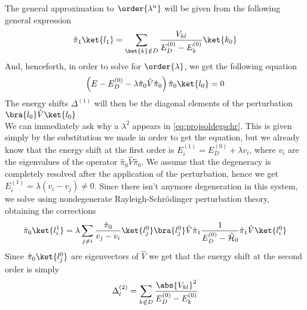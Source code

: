 \documentclass[a4paper, 11pt]{book}
\newcommand{\1}{\opr{\mathds{1}}}
\newcommand{\ham}{\mathcal{H}}
\newcommand{\opr}[1]{\hat{#1}}
\theoremstyle{plain}
\begin{document}
	The general approximation to $\order{\lambda^n}$ will be given from the following general expression
	\begin{equation*}
		\opr{\pi}_1\ket{l_1}=\sum_{\ket{k}\notin D}\frac{V_{kl}}{E_D^{(0)}-E_k^{(0)}}\ket{k_0}
	\end{equation*}
	And, henceforth, in order to solve for $\order{\lambda}$, we get the following equation
	\begin{equation}
		\left( E-E_D^{(0)}-\lambda\opr{\pi}_0\opr{V}\opr{\pi}_0 \right)\opr{\pi}_0\ket{l_0}=0
		\label{eq:firstorderdegenerate}
	\end{equation}
	The energy shifts $\Delta^{(1)}$ will then be the diagonal elements of the perturbation $\bra{l_0}\opr{V}\ket{l_0}$\\
	We can immediately ask why a $\lambda^2$ appears in \eqref{eq:projsoldegschr}. This is given simply by the substitution we made in order to get the equation, but we already know that the energy shift at the first order is $E_i^{(1)}=E_D^{(0)}+\lambda v_i$, where $v_i$ are the eigenvalues of the operator $\opr{\pi}_0\opr{V}\opr{\pi}_0$. We assume that the degeneracy is completely resolved after the application of the perturbation, hence we get $E_i^{(1)}=\lambda(v_i-v_j)\ne0$. Since there isn't anymore degeneration in this system, we solve using nondegenerate Rayleigh-Schrödinger perturbation theory, obtaining the corrections
	\begin{equation}
		\opr{\pi}_0\ket{l^1_i}=\lambda\sum_{j\ne i}\frac{\opr{\pi}_0}{v_j-v_i}\ket{l_j^0}\bra{l_j^0}\opr{V}\opr{\pi}_1\frac{1}{E_D^{(0)}-\opr{\ham}_0}\opr{\pi}_1\opr{V}\ket{l_i^0}
		\label{eq:correctionsdegeigenkets}
	\end{equation}
	Since $\opr{\pi}_0\ket{l_j^0}$ are eigenvectors of $\opr{V}$ we get that the energy shift at the second order is simply
	\begin{equation}
		\Delta_l^{(2)}=\sum_{k\notin D}\frac{\abs{V_{kl}}^2}{E_D^{(0)}-E_k^{(0)}}
		\label{eq:deg2ordshift}
	\end{equation}
\end{document}
